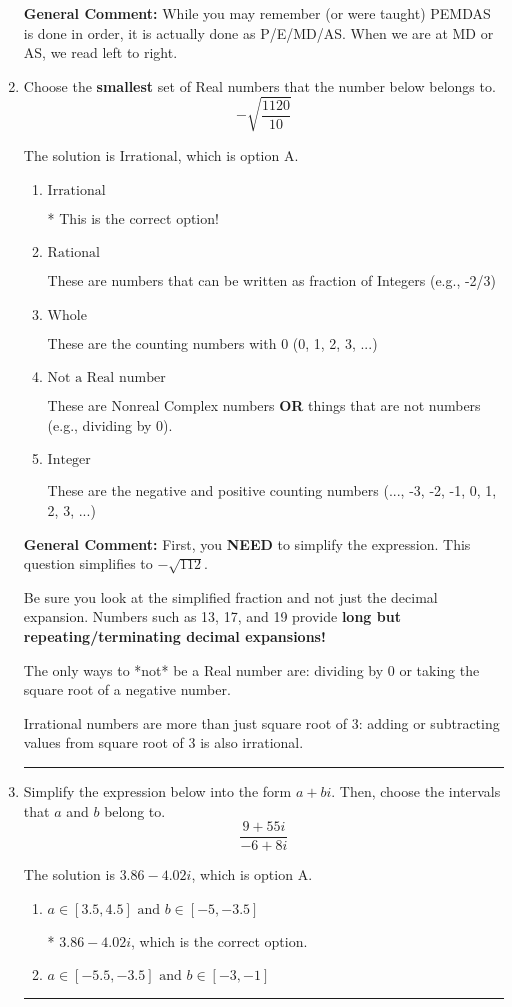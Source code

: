 \documentclass{extbook}[14pt]
\newcommand{\litem}[1]{\item #1

\rule{\textwidth}{0.4pt}}
\begin{document}
\begin{enumerate}
{\textbf{General Comment:} While you may remember (or were taught) PEMDAS is done in order, it is actually done as P/E/MD/AS. When we are at MD or AS, we read left to right.
}
\litem{
Choose the \textbf{smallest} set of Real numbers that the number below belongs to.
\[ -\sqrt{\frac{1120}{10}} \]

The solution is \( \text{Irrational} \), which is option A.\begin{enumerate}[label=\Alph*.]
\item \( \text{Irrational} \)

* This is the correct option!
\item \( \text{Rational} \)

These are numbers that can be written as fraction of Integers (e.g., -2/3)
\item \( \text{Whole} \)

These are the counting numbers with 0 (0, 1, 2, 3, ...)
\item \( \text{Not a Real number} \)

These are Nonreal Complex numbers \textbf{OR} things that are not numbers (e.g., dividing by 0).
\item \( \text{Integer} \)

These are the negative and positive counting numbers (..., -3, -2, -1, 0, 1, 2, 3, ...)
\end{enumerate}

\textbf{General Comment:} First, you \textbf{NEED} to simplify the expression. This question simplifies to $-\sqrt{112}$. 
 
 Be sure you look at the simplified fraction and not just the decimal expansion. Numbers such as 13, 17, and 19 provide \textbf{long but repeating/terminating decimal expansions!} 
 
 The only ways to *not* be a Real number are: dividing by 0 or taking the square root of a negative number. 
 
 Irrational numbers are more than just square root of 3: adding or subtracting values from square root of 3 is also irrational.
}
\litem{
Simplify the expression below into the form $a+bi$. Then, choose the intervals that $a$ and $b$ belong to.
\[ \frac{9 + 55 i}{-6 + 8 i} \]

The solution is \( 3.86  - 4.02 i \), which is option A.\begin{enumerate}[label=\Alph*.]
\item \( a \in [3.5, 4.5] \text{ and } b \in [-5, -3.5] \)

* $3.86  - 4.02 i$, which is the correct option.
\item \( a \in [-5.5, -3.5] \text{ and } b \in [-3, -1] \)


\end{enumerate}}
\end{enumerate}
\end{document}
